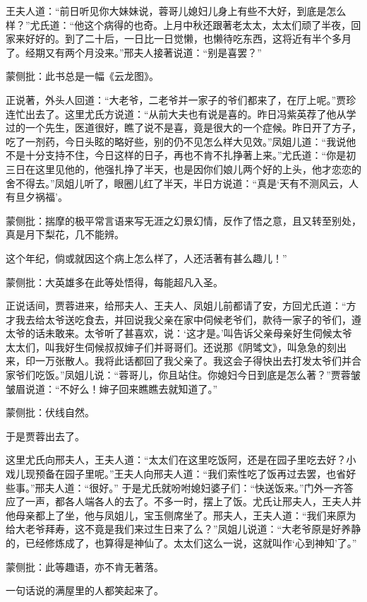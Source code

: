 \begin{parag}


    王夫人道：“前日听见你大妹妹说，蓉哥儿媳妇儿身上有些不大好，到底是怎么样？”尤氏道：“他这个病得的也奇。上月中秋还跟著老太太，太太们顽了半夜，回家来好好的。到了二十后，一日比一日觉懒，也懒待吃东西，这将近有半个多月了。经期又有两个月没来。”邢夫人接著说道：“别是喜罢？”\begin{note}蒙侧批：此书总是一幅《云龙图》。\end{note}
\end{parag}


\begin{parag}


    正说著，外头人回道：“大老爷，二老爷并一家子的爷们都来了，在厅上呢。”贾珍连忙出去了。这里尤氏方说道：“从前大夫也有说是喜的。昨日冯紫英荐了他从学过的一个先生，医道很好，瞧了说不是喜，竟是很大的一个症候。昨日开了方子，吃了一剂药，今日头眩的略好些，别的仍不见怎么样大见效。”凤姐儿道：“我说他不是十分支持不住，今日这样的日子，再也不肯不扎挣著上来。”尤氏道：“你是初三日在这里见他的，他强扎挣了半天，也是因你们娘儿两个好的上头，他才恋恋的舍不得去。”凤姐儿听了，眼圈儿红了半天，半日方说道：“真是‘天有不测风云，人有旦夕祸福’。\begin{note}蒙侧批：揣摩的极平常言语来写无涯之幻景幻情，反作了悟之意，且又转至别处，真是月下梨花，几不能辨。\end{note}这个年纪，倘或就因这个病上怎么样了，人还活著有甚么趣儿！”\begin{note}蒙侧批：大英雄多在此等处悟得，每能超凡入圣。\end{note}正说话间，贾蓉进来，给邢夫人、王夫人、凤姐儿前都请了安，方回尤氏道：“方才我去给太爷送吃食去，并回说我父亲在家中伺候老爷们，款待一家子的爷们，遵太爷的话未敢来。太爷听了甚喜欢，说：‘这才是。’叫告诉父亲母亲好生伺候太爷太太们，叫我好生伺候叔叔婶子们并哥哥们。还说那《阴骘文》，叫急急的刻出来，印一万张散人。我将此话都回了我父亲了。我这会子得快出去打发太爷们并合家爷们吃饭。”凤姐儿说：“蓉哥儿，你且站住。你媳妇今日到底是怎么著？”贾蓉皱皱眉说道：“不好么！婶子回来瞧瞧去就知道了。”\begin{note}蒙侧批：伏线自然。\end{note}于是贾蓉出去了。
\end{parag}


\begin{parag}


    这里尤氏向邢夫人，王夫人道：“太太们在这里吃饭阿，还是在园子里吃去好？小戏儿现预备在园子里呢。”王夫人向邢夫人道：“我们索性吃了饭再过去罢，也省好些事。”邢夫人道：“很好。” 于是尤氏就吩咐媳妇婆子们：“快送饭来。”门外一齐答应了一声，都各人端各人的去了。不多一时，摆上了饭。尤氏让邢夫人，王夫人并他母亲都上了坐，他与凤姐儿，宝玉侧席坐了。邢夫人，王夫人道：“我们来原为给大老爷拜寿，这不竟是我们来过生日来了么？”凤姐儿说道：“大老爷原是好养静的，已经修炼成了，也算得是神仙了。太太们这么一说，这就叫作‘心到神知’了。”\begin{note}蒙侧批：此等趣语，亦不肯无著落。\end{note}一句话说的满屋里的人都笑起来了。
\end{parag}


